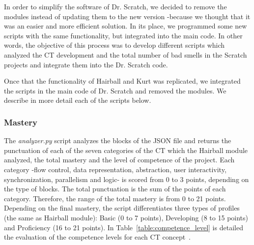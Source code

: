 In order to simplify the software of Dr. Scratch, we decided to remove the modules instead of updating them to the new version -because we thought that it was an easier and more efficient solution. In its place, we programmed some new scripts with the same functionality, but integrated into the main code. In other words, the objective of this process was to develop different scripts which analyzed the CT development and the total number of bad smells in the Scratch projects and integrate them into the Dr. Scratch code.

Once that the functionality of Hairball and Kurt was replicated, we integrated the scripts in the main code of Dr. Scratch and removed the modules. We describe in more detail each of the scripts below. 

\subsubsection{Mastery}
\label{subsubsec:mastery}

The \textit{analyzer.py} script analyzes the blocks of the JSON file and returns the punctuation of each of the seven categories of the CT which the Hairball module analyzed, the total mastery and the level of competence of the project. Each category -flow control, data representation, abstraction, user interactivity, synchronization, parallelism and logic- is scored from 0 to 3 points, depending on the type of blocks. The total punctuation is the sum of the points of each category. Therefore, the range of the total mastery is from 0 to 21 points. Depending on the final mastery, the script differentiates three types of profiles (the same as Hairball module): Basic (0 to 7 points), Developing (8 to 15 points) and Proficiency (16 to 21 points). In Table~\ref{table:competence_level} is detailed the evaluation of the competence levels for each CT concept~\cite{moreno2015dr}.

